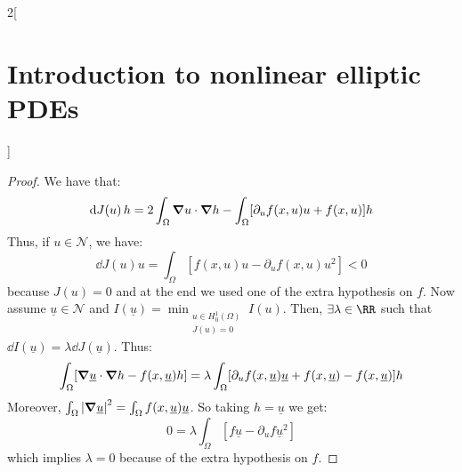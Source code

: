 \documentclass[../../../main_math.tex]{subfiles}
\begin{document}
\begin{multicols}{2}[\section{Introduction to nonlinear elliptic PDEs}]
\begin{proposition}
  \end{proposition}
  \begin{proof}
    We have that:
    $$
      \dd{J(u)}h=2\int_\Omega \grad u\cdot \grad h-\int_\Omega [\partial_uf(x,u)u +f(x,u)]h
    $$
    Thus, if $u\in \mathcal{N}$, we have:
    $$
      \dd{J(u)}u=\int_\Omega[f(x,u)u -\partial_uf(x,u)u^2] <0
    $$
    because $J(u)=0$ and at the end we used one of the extra hypothesis on $f$. Now assume $\underline{u}\in\mathcal{N}$ and $I(\underline{u})=\displaystyle \min_{\substack{u\in H_0^1(\Omega) \\ J(u)=0}}I(u)$. Then, $\exists \lambda\in\RR$ such that $\dd{I(\underline{u})}=\lambda \dd{J(\underline{u})}$. Thus:
    $$
      \int_\Omega [\grad \underline{u}\cdot \grad h-f(x,\underline{u})h]=\lambda \int_\Omega [\partial_uf(x,\underline{u})\underline{u}+f(x,\underline{u})-f(x,\underline{u})]h
    $$
    Moreover, $\int_\Omega \abs{\grad \underline{u}}^2=\int_\Omega f(x,\underline{u}) \underline{u}$. So taking $h=\underline{u}$ we get:
    $$
      0=\lambda \int_\Omega [f\underline{u}-\partial_uf\underline{u}^2]
    $$
    which implies $\lambda=0$ because of the extra hypothesis on $f$.
  \end{proof}

\end{multicols}
\end{document}

